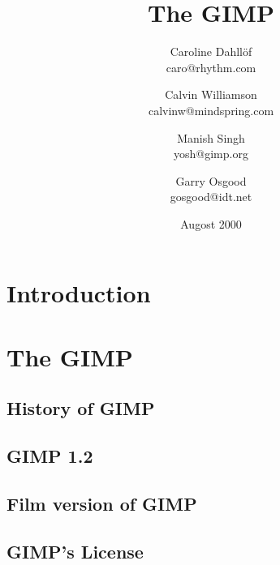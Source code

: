 \documentclass{report}
\begin{document}
\begin{titlepage}
\title{\huge The GIMP}
\author{Caroline Dahll\"{o}f\\
caro@rhythm.com 
\and Calvin Williamson\\
calvinw@mindspring.com
\and Manish Singh\\
yosh@gimp.org
\and Garry Osgood\\
gosgood@idt.net}
\date{Augost 2000}
\maketitle
\end{titlepage}
\tableofcontents


% 
%



\chapter{Introduction}


\chapter{The GIMP}

\section{History of GIMP} 
\section{GIMP 1.2}

\section{Film version of GIMP} 

\section{GIMP's License}
\end{document}
